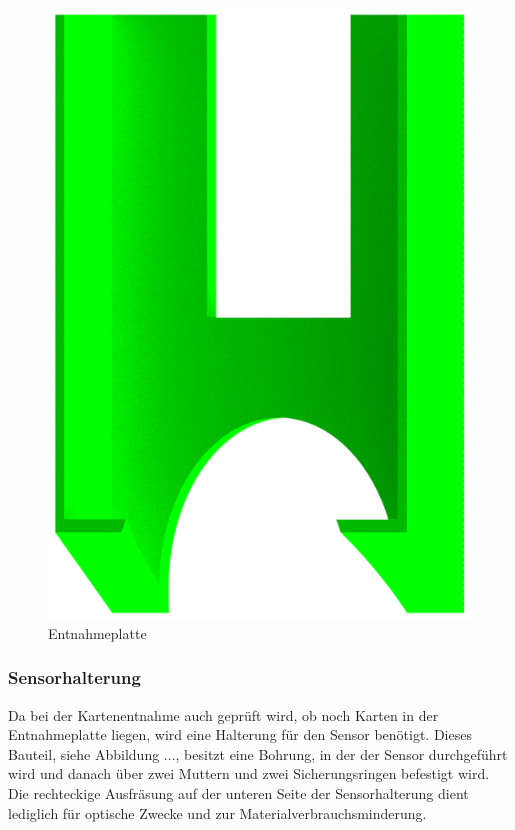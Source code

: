 \begin{figure}
    \centering
    \includegraphics[scale=0.5,page=1]{fig/mech/Ausgabefach.png}
    \caption{Entnahmeplatte}
\end{figure}

\subsubsection{Sensorhalterung}
Da bei der Kartenentnahme auch geprüft wird, ob noch Karten in der Entnahmeplatte liegen, wird eine Halterung für den
Sensor benötigt. Dieses Bauteil, siehe Abbildung ..., besitzt eine Bohrung, in der der Sensor durchgeführt wird und danach über zwei Muttern und
zwei Sicherungsringen befestigt wird. Die rechteckige Ausfräsung auf der unteren Seite der Sensorhalterung dient lediglich
für optische Zwecke und zur Materialverbrauchsminderung.

